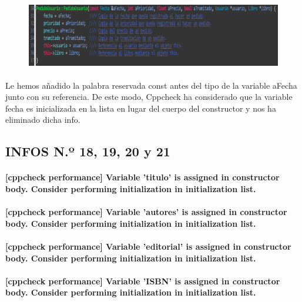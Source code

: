 			\begin{figure}[H]
				\centering
				\includegraphics[scale=0.55]{img/esteban25.png}
				\label{esteban25}
			\end{figure}
		
			\paragraph{}Le hemos añadido la palabra reservada const antes del tipo de la variable aFecha junto con su referencia. De este modo, Cppcheck ha considerado que la variable fecha es inicializada en la lista en lugar del cuerpo del constructor y nos ha eliminado dicha info.
			
	\subsection{INFOS N.º 18, 19, 20 y 21}
	
		\paragraph{[cppcheck performance] Variable 'titulo' is assigned in constructor body. Consider performing initialization in initialization list.}
		
		\paragraph{[cppcheck performance] Variable 'autores' is assigned in constructor body. Consider performing initialization in initialization list.}
		
		\paragraph{[cppcheck performance] Variable 'editorial' is assigned in constructor body. Consider performing initialization in initialization list.}
		
		\paragraph{[cppcheck performance] Variable 'ISBN' is assigned in constructor body. Consider performing initialization in initialization list.}
	
